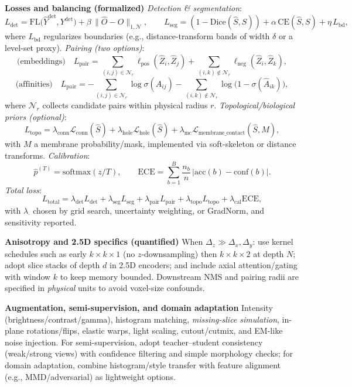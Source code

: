 \medskip
\noindent\textbf{Losses and balancing (formalized)}\;
\emph{Detection \& segmentation}:
\[
L_{\text{det}}
=\mathrm{FL}\big(\hat{Y}^{\text{det}},Y^{\text{det}}\big)
+\beta\,\lVert \hat{O}-O\rVert_{1,\mathcal{N}},\qquad
L_{\text{seg}}
=(1-\mathrm{Dice}(\hat{S},S))+\alpha\,\mathrm{CE}(\hat{S},S)+\eta\,L_{\text{bd}},
\]
where \(L_{\text{bd}}\) regularizes boundaries (e.g., distance-transform bands of width \(\delta\) or a level-set proxy).
\emph{Pairing (two options)}:
\[
\text{(embeddings)}\quad
L_{\text{pair}}
=\sum_{(i,j)\in\mathcal{N}_r}\ell_{\text{pos}}(\hat{Z}_i,\hat{Z}_j)
+\sum_{(i,k)\notin\mathcal{N}_r}\ell_{\text{neg}}(\hat{Z}_i,\hat{Z}_k),
\]
\[
\text{(affinities)}\quad
L_{\text{pair}}
=-\!\!\sum_{(i,j)\in\mathcal{N}_r}\!\!\log\sigma(\hat{A}_{ij})
-\!\!\sum_{(i,k)\notin\mathcal{N}_r}\!\!\log\!\big(1-\sigma(\hat{A}_{ik})\big),
\]
where \(\mathcal{N}_r\) collects candidate pairs within physical radius \(r\).
\emph{Topological/biological priors (optional)}:
\[
L_{\text{topo}}
=\lambda_{\mathrm{conn}}\mathcal{L}_{\mathrm{conn}}(\hat{S})
+\lambda_{\mathrm{hole}}\mathcal{L}_{\mathrm{hole}}(\hat{S})
+\lambda_{\mathrm{mc}}\mathcal{L}_{\mathrm{membrane\_contact}}(\hat{S},M),
\]
with \(M\) a membrane probability/mask, implemented via soft-skeleton or distance transforms.
\emph{Calibration}:
\[
\hat{p}^{(T)}=\mathrm{softmax}(z/T),\qquad
\mathrm{ECE}=\sum_{b=1}^{B}\frac{n_b}{n}\,\bigl|\mathrm{acc}(b)-\mathrm{conf}(b)\bigr|.
\]
\emph{Total loss}:
\[
L_{\text{total}}
=\lambda_{\text{det}}L_{\text{det}}
+\lambda_{\text{seg}}L_{\text{seg}}
+\lambda_{\text{pair}}L_{\text{pair}}
+\lambda_{\text{topo}}L_{\text{topo}}
+\lambda_{\text{cal}}\mathrm{ECE},
\]
with \(\lambda_{\cdot}\) chosen by grid search, uncertainty weighting, or GradNorm, and sensitivity reported.\par

\medskip
\noindent\textbf{Anisotropy and 2.5D specifics (quantified)}\;
When \(\Delta_z\gg \Delta_x,\Delta_y\): use kernel schedules such as early \(k\times k\times 1\) (no \(z\)-downsampling) then \(k\times k\times 2\) at depth \(N\); adopt slice stacks of depth \(d\) in 2.5D encoders; and include axial attention/gating with window \(k\) to keep memory bounded. Downstream NMS and pairing radii are specified in \emph{physical} units to avoid voxel-size confounds.\par

\medskip
\noindent\textbf{Augmentation, semi-supervision, and domain adaptation}\;
Intensity (brightness/contrast/gamma), histogram matching, \emph{missing-slice simulation}, in-plane rotations/flips, elastic warps, light scaling, cutout/cutmix, and EM-like noise injection.
For semi-supervision, adopt teacher--student consistency (weak/strong views) with confidence filtering and simple morphology checks; for domain adaptation, combine histogram/style transfer with feature alignment (e.g., MMD/adversarial) as lightweight options.\par

